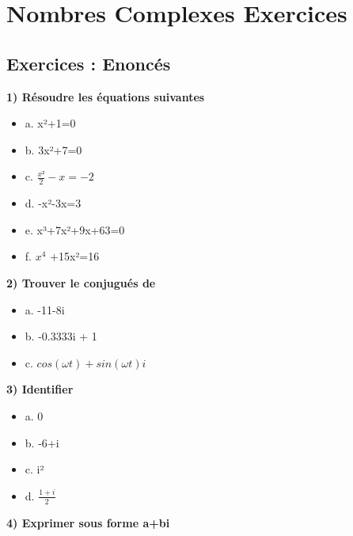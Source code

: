 \newpage

\chapter{Nombres Complexes Exercices}
\vspace{5mm} %
\section{Exercices : Enoncés}

\vspace{5mm} %
\textbf{1) Résoudre les équations suivantes}

\begin{itemize}
\item {a. x²+1=0}
\item {b. 3x²+7=0}
\item {c. $\frac{x²}{2} -x=-2$}
\item {d. -x²-3x=3}
\item {e. x³+7x²+9x+63=0}
\item {f. $x^{4}$ +15x²=16}
\end{itemize}

\vspace{3mm} %
\textbf{2) Trouver le conjugués de }

\begin{itemize}
\item {a. -11-8i}
\item {b. -0.3333i + 1}
\item {c. $cos(\omega t) + sin(\omega t)i$}
\end{itemize}

\vspace{3mm} %
\textbf{3) Identifier \R $  $ \I}

\begin{itemize}
\item {a. 0}
\item {b. -6+i}
\item {c. i²}
\item {d. $\frac{1+i}{2}$}
\end{itemize}


\vspace{3mm} %
\textbf{4) Exprimer sous forme a+bi}

